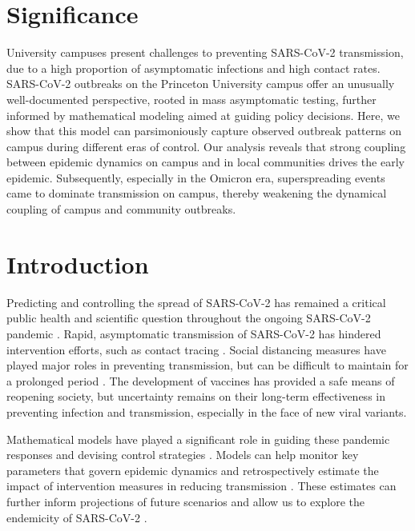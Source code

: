 \documentclass[12pt]{article}
\begin{document}
\section*{Significance}

University campuses present challenges to preventing SARS-CoV-2 transmission, due to a high proportion of asymptomatic infections and high contact rates. SARS-CoV-2 outbreaks on the Princeton University campus offer an unusually well-documented perspective, rooted in mass asymptomatic testing, further informed by mathematical modeling aimed at guiding policy decisions. Here, we show that this model can parsimoniously capture observed outbreak patterns on campus during different eras of control. Our analysis reveals that strong coupling between epidemic dynamics on campus and in local communities drives the early epidemic. Subsequently, especially in the Omicron era, superspreading events came to dominate transmission on campus, thereby weakening the dynamical coupling of campus and community outbreaks.

\pagebreak

\section*{Introduction}

Predicting and controlling the spread of SARS-CoV-2 has remained a critical public health and scientific question throughout the ongoing SARS-CoV-2 pandemic \citep{baker2021limits}.
Rapid, asymptomatic transmission of SARS-CoV-2 has hindered intervention efforts, such as contact tracing \citep{hellewell2020feasibility}.
Social distancing measures have played major roles in preventing transmission, but can be difficult to maintain for a prolonged period \citep{galanti2021social}.
The development of vaccines has provided a safe means of reopening society, but uncertainty remains on their long-term effectiveness in preventing infection and transmission, especially in the face of new viral variants.

Mathematical models have played a significant role in guiding these pandemic responses and devising control strategies \citep{cobey2020modeling,holmdahl2020wrong,metcalf2020mathematical,koelle2022changing}.
Models can help monitor key parameters that govern epidemic dynamics \citep{kraemer2021monitoring} and retrospectively estimate the impact of intervention measures in reducing transmission \citep{flaxman2020estimating}.
These estimates can further inform projections of future scenarios and allow us to explore the endemicity of SARS-CoV-2 \citep{kissler2020projecting,saad2020immune,lavine2021immunological,saad2021epidemiological}.
\end{document}
